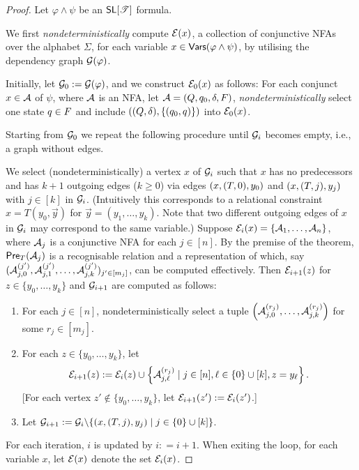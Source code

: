 \begin{proof}
Let $\varphi \wedge \psi$ be an $\textsf{SL}[\mathscr{T}]$ formula. 

We first \emph{nondeterministically} compute $\mathcal{E}(x)$, a collection of conjunctive NFAs over the alphabet $\Sigma$, for each variable $x \in \mathsf{Vars}(\varphi \wedge \psi)$, by utilising the dependency graph $\mathcal{G}(\varphi)$. 

Initially, let $\mathcal{G}_0 := \mathcal{G}(\varphi)$, and  
we construct $\mathcal{E}_0(x)$ as follows: For each conjunct 
$x \in \mathcal{A}$ of $\psi$, where $\mathcal{A}$ is an NFA, let $\mathcal{A} = (Q, q_0, \delta, F)$, \emph{nondeterministically} select one state $q \in F$ and include $((Q, \delta), \{(q_0, q)\})$ into $\mathcal{E}_0(x)$.
  

Starting from $\mathcal{G}_0$ we repeat the following procedure until %
$\mathcal{G}_i$ becomes empty, i.e., a graph without edges.
 
We select (nondeterministically) a vertex $x$ of $\mathcal{G}_i$ such that $x$ has no predecessors and has $k+1$ outgoing edges ($k\geq 0$) via edges $(x, (T, 0), y_0)$ and $(x, (T, j), y_j)$ with $j \in [k]$ in $\mathcal{G}_i$. 
(Intuitively this corresponds to a relational constraint $x=T(y_0, \vec{y})$ for $\vec{y}=(y_1, \ldots, y_k)$.
Note that two different outgoing edges of $x$ in $\mathcal{G}_i$ may correspond to the same variable.)
Suppose $\mathcal{E}_i(x)=\{\mathcal{A}_1, \ldots, \mathcal{A}_n\}$, 
where $\mathcal{A}_j$ is a conjunctive NFA for each $j \in [n]$.
By the premise of the theorem, $\textsf{Pre}_{T}(\mathcal{A}_j)$ is a recognisable relation and a representation of which, say $(\mathcal{A}^{(j')}_{j, 0}, \mathcal{A}^{(j')}_{j, 1}, \ldots, \mathcal{A}^{(j')}_{j, k})_{ j'  \in [m_j]}$, can be computed effectively.
Then $\mathcal{E}_{i+1}(z)$ for $z \in  \{y_0,\ldots, y_k\}$ and $\mathcal{G}_{i+1}$ are computed as follows:
\begin{enumerate}
\item For each $j \in [n]$, nondeterministically select a tuple $\left(\mathcal{A}^{(r_j)}_{j, 0}, \ldots, \mathcal{A}^{(r_j)}_{j, k}\right)$ for some $r_j \in [m_j]$.
%
\item For each $z \in \{y_0,\ldots, y_k\}$, let
\[
    \mathcal{E}_{i+1}(z):= \mathcal{E}_{i}(z) \cup \left\{\mathcal{A}^{(r_j)}_{j, \ell} \mid  j \in [n], \ell \in \{0\} \cup [k], z = y_{\ell} \right\}.
\]
[For each vertex $z'  {\notin} \{y_0,\ldots, y_k\}$, let $\mathcal{E}_{i+1}(z') := \mathcal{E}_i(z')$.]
%
\item Let $\mathcal{G}_{i+1}:= \mathcal{G}_i \backslash \{(x, (T, j), y_j) \mid j \in \{0\} \cup [k]\}$.
\end{enumerate}
For each iteration, $i$ is updated by  $i: = i+1$.
%
When exiting the loop, for each variable $x$, let $\mathcal{E}(x)$ denote the set $\mathcal{E}_i(x)$.


\end{proof}
